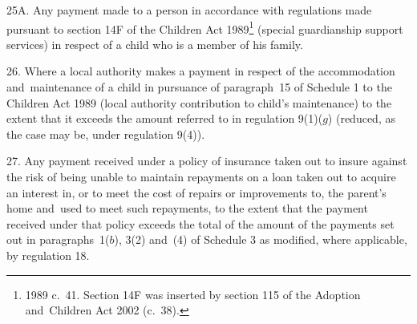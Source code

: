 \documentclass[12pt,a4paper]{article}
\begin{document}
\medskip

25A.  Any payment made to a person in accordance with regulations made pursuant to section 14F of the Children Act 1989\footnote{1989 c.~41. Section 14F was inserted by section 115 of the Adoption and~Children Act 2002 (c.\ 38).} (special guardianship support services) in respect of a child who is a member of his family.


\medskip

26.  Where a local authority makes a payment in respect of the accommodation and~maintenance of a child in pursuance of paragraph~15 of Schedule 1 to the Children Act 1989
(local authority contribution to child’s maintenance) to the extent that it exceeds the amount referred to in 
regulation 9(1)($g$) %
(reduced, as the case may be, under regulation 9(4)).


\medskip

27.  Any payment received under a policy of insurance taken out to insure against the risk of being unable to maintain repayments on a loan taken out to acquire an interest in, or to meet the cost of repairs or improvements to, the parent’s home and~used to meet such repayments, to the extent that the payment received under that policy 
exceeds  %
%
%
the total of the amount of the payments set out in paragraphs~1($b$), 3(2) and~(4) of Schedule 3 as modified, where applicable, by regulation 18.  %

\end{document}
